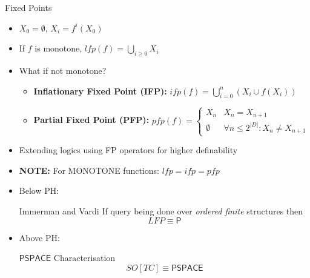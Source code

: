 \documentclass[usenames,dvipsnames]{beamer}
\newcommand{\PSPACE}{\mathsf{PSPACE}}
\newcommand{\PTime}{\mathsf{P}}
\begin{document}
\begin{frame}{Fixed Points}
    \begin{itemize}
        \item $X_0 = \emptyset$, $X_i = f^i(X_0)$
        \item If $f$ is monotone, $lfp(f) = \bigcup_{i\geq 0}X_i$
        \item What if not monotone?
        \begin{itemize}
            \item \textbf{Inflationary Fixed Point (IFP):} $ifp(f) = \bigcup_{i=0}^n (X_i\cup f(X_i))$
            \item \textbf{Partial Fixed Point (PFP):} $ pfp(f) = 
                                                                        \begin{cases} 
                                                                            X_n & X_n = X_{n+1} \\
                                                                            \emptyset & \forall n\leq 2^{|D|}:X_n \neq X_{n+1}
                                                                        \end{cases}
                                                        $
        \end{itemize}
        \item Extending logics using FP operators for higher definability
        \item \textbf{NOTE:} For MONOTONE functions: $lfp = ifp = pfp$
    \end{itemize}
\end{frame}

\begin{itemize}
    \item[] Below PH:
    \begin{block}{Immerman and Vardi}
    If query being done over \emph{ordered finite} structures then
    $$
    LFP\equiv\PTime
    $$    
    \end{block}

    \item[] Above PH:
    \begin{block}{$\PSPACE$ Characterisation}
        $$
        SO[TC]\equiv\PSPACE
        $$    
        \end{block}
\end{itemize}
\end{document}
